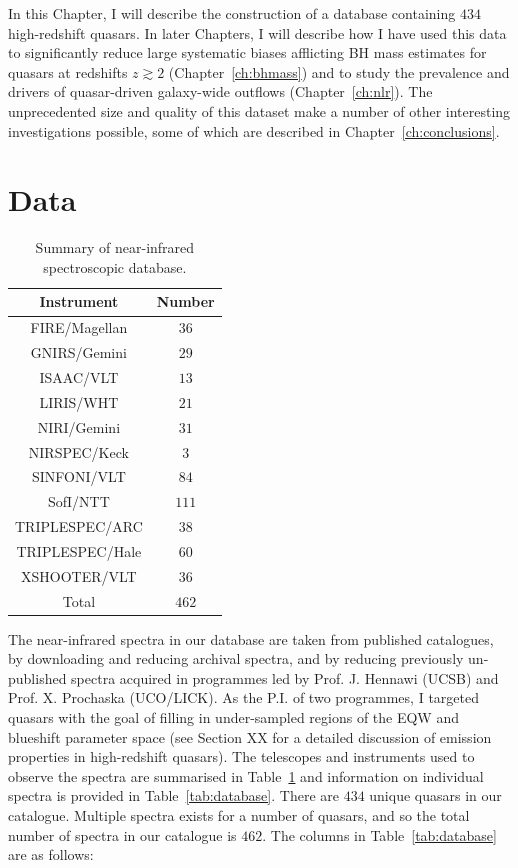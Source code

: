 In this Chapter, I will describe the construction of a database containing $434$ high-redshift quasars. 
In later Chapters, I will describe how I have used this data to significantly reduce large systematic biases afflicting BH mass estimates for quasars at redshifts $z \gtrsim 2$ (Chapter~\ref{ch:bhmass}) and to study the prevalence and drivers of quasar-driven galaxy-wide outflows (Chapter~\ref{ch:nlr}). 
The unprecedented size and quality of this dataset make a number of other interesting investigations possible, some of which are described in Chapter~\ref{ch:conclusions}. 

\section{Data}

\begin{table}
  \footnotesize
  \centering
  \caption{Summary of near-infrared spectroscopic database.}
  \label{tab:data_summary}
    \begin{tabular}{cc} 
    \hline
    Instrument & Number \\  
    \hline
    FIRE/Magellan   & $36$ \\
    GNIRS/Gemini    & $29$ \\
    ISAAC/VLT       & $13$  \\
    LIRIS/WHT       & $21$  \\
    NIRI/Gemini     & $31$ \\
    NIRSPEC/Keck    & $3$   \\ 
    SINFONI/VLT     & $84$ \\
    SofI/NTT        & $111$ \\
    TRIPLESPEC/ARC  & $38$ \\
    TRIPLESPEC/Hale & $60$ \\
    XSHOOTER/VLT    & $36$  \\
    \hline
    Total & $462$ \\
    \hline
    \end{tabular}
\end{table}

The near-infrared spectra in our database are taken from published catalogues, by downloading and reducing
archival spectra, and by reducing previously un-published spectra acquired in programmes led by Prof. J. Hennawi (UCSB) and Prof. X. Prochaska (UCO/LICK). 
As the P.I. of two programmes, I targeted quasars with the goal of filling in under-sampled regions of the  EQW and blueshift parameter space (see Section XX for a detailed discussion of  emission properties in high-redshift quasars).
The telescopes and instruments used to observe the spectra are summarised in Table~\ref{tab:data_summary} and information on individual spectra is provided in Table~\ref{tab:database}.
There are $434$ unique quasars in our catalogue. 
Multiple spectra exists for a number of quasars, and so the total number of spectra in our catalogue is $462$. 
The columns in Table~\ref{tab:database} are as follows: 

